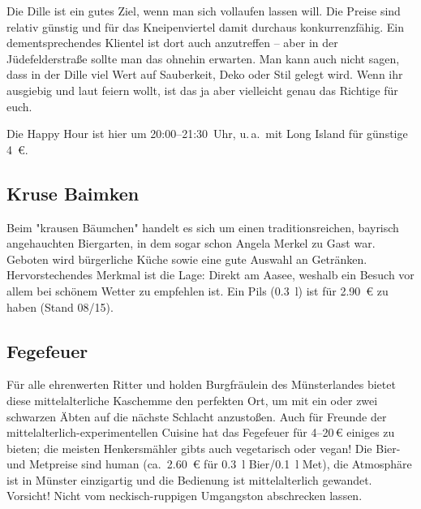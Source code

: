 {\begin{multicols*}{2}
Die Dille ist ein gutes Ziel, wenn man sich vollaufen lassen will.
Die Preise sind relativ günstig und für das Kneipenviertel damit durchaus konkurrenzfähig.
Ein dementsprechendes Klientel ist dort auch anzutreffen -- aber in der Jüdefelderstraße sollte man das ohnehin erwarten.
Man kann auch nicht sagen, dass in der Dille viel Wert auf Sauberkeit, Deko oder Stil gelegt wird.
Wenn ihr ausgiebig und laut feiern wollt, ist das ja aber vielleicht genau das Richtige für euch.

Die Happy Hour ist hier um 20:00--21:30~Uhr, u.\,a.\ mit Long Island für günstige \SI{4}{\euro}.

\begin{center}
\end{center}

\subsection{Kruse Baimken}
Beim "krausen Bäumchen" handelt es sich um einen traditionsreichen, bayrisch angehauchten Biergarten, in dem sogar schon Angela Merkel zu Gast war.
Geboten wird bürgerliche Küche sowie eine gute Auswahl an Getränken.
Hervorstechendes Merkmal ist die Lage: Direkt am Aasee, weshalb ein Besuch vor allem bei schönem Wetter zu empfehlen ist.
Ein Pils (\SI{0,3}{\l}) ist für \SI{2,90}{\euro} zu haben (Stand 08/15).

\begin{center}
\end{center}

\subsection{Fegefeuer}
Für alle ehrenwerten Ritter und holden Burgfräulein des Münsterlandes bietet diese mittelalterliche Kaschemme den perfekten Ort, um mit ein oder zwei schwarzen Äbten auf die nächste Schlacht anzustoßen.
Auch für Freunde der mittelalterlich-experimentellen Cuisine hat das Fegefeuer für 4--20\,€ einiges zu bieten; die meisten Henkersmähler gibts auch vegetarisch oder vegan! Die Bier- und Metpreise sind human (ca.\ \SI{2,60}{\euro} für \SI{0,3}{\l} Bier/\SI{0,1}{\l} Met), die Atmosphäre ist in Münster einzigartig und die Bedienung ist mittelalterlich gewandet.
Vorsicht! Nicht vom neckisch-ruppigen Umgangston abschrecken lassen.


\end{multicols*}}

